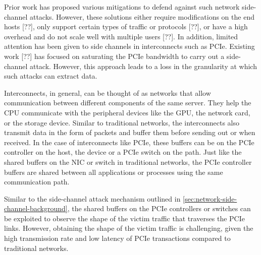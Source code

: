 Prior work has proposed various mitigations to defend against such network side-channel attacks. However, these solutions either require modifications on the end hosts [??], %
only support certain types of traffic or protocols [??], %
or have a high overhead and do not scale well with multiple users [??]. %
In addition, limited attention has been given to side channels in interconnects such as PCIe. 
Existing work [??] has focused on saturating the PCIe bandwidth to carry out a side-channel attack. However, this approach leads to a loss in the granularity at which such attacks can extract data.

Interconnects, in general, can be thought of as networks that allow communication between different components of the same server. 
They help the CPU communicate with the peripheral devices like the GPU, the network card, or the storage device. 
Similar to traditional networks, the interconnects also transmit data in the form of packets and buffer them before sending out or when received.
In the case of interconnects like PCIe, these buffers can be on the PCIe controller on the host, the device or a PCIe switch on the path.
Just like the shared buffers on the NIC or switch in traditional networks, the PCIe controller buffers are shared between all applications or processes using the same communication path.

Similar to the side-channel attack mechanism outlined in \ref{sec:network-side-channel-background}, the shared buffers on the PCIe controllers or switches can be exploited to observe the shape of the victim traffic that traverses the PCIe links.
However, obtaining the shape of the victim traffic is challenging, given the high transmission rate and low latency of PCIe transactions compared to traditional networks.

